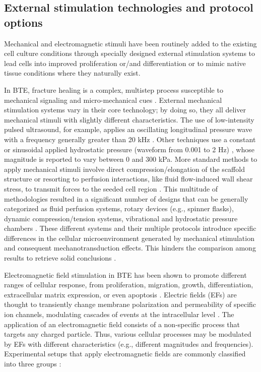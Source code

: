 \subsection{External stimulation technologies and protocol options}

Mechanical and electromagnetic stimuli have been routinely added to the existing cell culture conditions through specially designed external stimulation systems to lead cells into improved proliferation or/and differentiation or to mimic native tissue conditions where they naturally exist.  

In BTE, fracture healing is a complex, multistep process susceptible to mechanical signaling and micro-mechanical cues \cite{Anani2022-vm}. External mechanical stimulation systems vary in their core technology; by doing so, they all deliver mechanical stimuli with slightly different characteristics. The use of low-intensity pulsed ultrasound, for example, applies an oscillating longitudinal pressure wave with a frequency generally greater than 20 kHz \cite{Harrison2021-gy}. Other techniques use a constant or sinusoidal applied hydrostatic pressure (waveform from 0.001 to 2 Hz) \cite{Henstock2013-co, Nesler2016-le, Stavenschi2018-ze}, whose magnitude is reported to vary between 0 and 300 kPa. More standard methods to apply mechanical stimuli involve direct compression/elongation of the scaffold structure or resorting to perfusion interactions, like fluid flow-induced wall shear stress, to transmit forces to the seeded cell region \cite{Wittkowske2016-xr}. This multitude of methodologies resulted in a significant number of designs that can be generally categorized as fluid perfusion systems, rotary devices (e.g., spinner flasks), dynamic compression/tension systems, vibrational and hydrostatic pressure chambers \cite{McCoy2010-hy, Sart2016-uq, Campsie2019-jq}. These different systems and their multiple protocols introduce specific differences in the cellular microenvironment generated by mechanical stimulation and consequent mechanotransduction effects. This hinders the comparison among results to retrieve solid conclusions \cite{Sun2022-xt}.

Electromagnetic field stimulation in BTE has been shown to promote different ranges of cellular response, from proliferation, migration, growth, differentiation, extracellular matrix expression, or even apoptosis \cite{Thrivikraman2018-su}. Electric fields (\acs{EFs}) are thought to transiently change membrane polarization and permeability of specific ion channels, modulating cascades of events at the intracellular level \cite{Bhavsar2019-iz}. The application of an electromagnetic field consists of a non-specific process that targets any charged particle. Thus, various cellular processes may be modulated by \acs{EFs} with different characteristics (e.g., different magnitudes and frequencies). Experimental setups that apply electromagnetic fields are commonly classified into three groups \cite{Thrivikraman2018-su, Balint2013-rd, Nicksic2022-jy}: 

